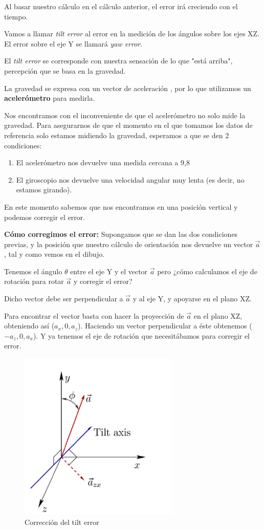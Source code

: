 \documentclass[twoside, 12pt]{epstfg}
\begin{document}
Al basar nuestro cálculo en el cálculo anterior, el error irá creciendo con el tiempo.

Vamos a llamar \textit{tilt error} al error en la medición de los ángulos sobre los ejes XZ. El error sobre el eje Y se llamará \textit{yaw error}.

El \textit{tilt error} se corresponde con nuestra sensación de lo que "está arriba", percepción que se basa en la gravedad.

La gravedad se expresa con un vector de aceleración , por lo que utilizamos un \textbf{acelerómetro} para medirla.

Nos encontramos con el inconveniente de que el acelerómetro no solo mide la gravedad. Para asegurarnos de que el momento en el que tomamos los datos de referencia solo estamos midiendo la gravedad, esperamos a que se den 2 condiciones:
\begin{enumerate}
	\item El acelerómetro nos devuelve una medida cercana a 9,8
	\item El giroscopio nos devuelve una velocidad angular muy lenta (es decir, no estamos girando).
\end{enumerate}

En este momento sabemos que nos encontramos en una posición vertical y podemos corregir el error.

\textbf{Cómo corregimos el error:}
Supongamos que se dan las dos condiciones previas, y la posición que nuestro cálculo de orientación nos devuelve un vector $\vec{a}$, tal y como vemos en el dibujo.

Tenemos el ángulo $\theta$ entre el eje Y y el vector $\vec{a}$ pero ¿cómo calculamos el eje de rotación para rotar $\vec{a}$ y corregir el error?

Dicho vector debe ser perpendicular a $\vec{a}$ y al eje Y, y apoyarse en el plano XZ.

Para encontrar el vector basta con hacer la proyección de $\vec{a}$ en el plano XZ, obteniendo así ($a_x, 0 , a_z$). Haciendo un vector perpendicular a éste obtenemos ($-a_z, 0 , a_x$). Y ya tenemos el eje de rotación que necesitábamos para corregir el error.

\begin{figure}[h]
	\centerline{
		\mbox{\includegraphics[width=3.00in]{images/ejestracking.png}}
	}
	\caption{Corrección del tilt error}
\end{figure}
\end{document}
